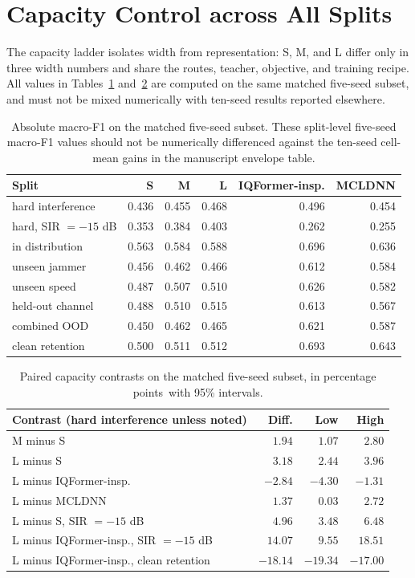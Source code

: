 \documentclass[letterpaper,onecolumn,11pt,journal]{IEEEtran}
\newcommand{\pp}{percentage points}
\begin{document}
\section{Capacity Control across All Splits}
The capacity ladder isolates width from representation: S, M, and L differ only
in three width numbers and share the routes, teacher, objective, and training
recipe. All values in Tables~\ref{tab:capabs} and~\ref{tab:capdiff} are
computed on the same matched five-seed subset, and must not be mixed
numerically with ten-seed results reported elsewhere.

\begin{table}[t]
\centering
\caption{Absolute macro-F1 on the matched five-seed subset. These split-level
five-seed macro-F1 values should not be numerically differenced against the
ten-seed cell-mean gains in the manuscript envelope table.}
\label{tab:capabs}
\footnotesize
\setlength{\tabcolsep}{4pt}
\begin{tabular}{lrrrrr}
\toprule
Split & S & M & L & IQFormer-insp. & MCLDNN\\
\midrule
hard interference & 0.436 & 0.455 & 0.468 & 0.496 & 0.454\\
hard, SIR $=-15$ dB & 0.353 & 0.384 & 0.403 & 0.262 & 0.255\\
in distribution & 0.563 & 0.584 & 0.588 & 0.696 & 0.636\\
unseen jammer & 0.456 & 0.462 & 0.466 & 0.612 & 0.584\\
unseen speed & 0.487 & 0.507 & 0.510 & 0.626 & 0.582\\
held-out channel & 0.488 & 0.510 & 0.515 & 0.613 & 0.567\\
combined OOD & 0.450 & 0.462 & 0.465 & 0.621 & 0.587\\
clean retention & 0.500 & 0.511 & 0.512 & 0.693 & 0.643\\
\bottomrule
\end{tabular}
\end{table}

\begin{table}[t]
\centering
\caption{Paired capacity contrasts on the matched five-seed subset, in \pp\
with 95\% intervals.}
\label{tab:capdiff}
\footnotesize
\setlength{\tabcolsep}{4pt}
\begin{tabular}{lrrr}
\toprule
Contrast (hard interference unless noted) & Diff. & Low & High\\
\midrule
M minus S & $1.94$ & $1.07$ & $2.80$\\
L minus S & $3.18$ & $2.44$ & $3.96$\\
L minus IQFormer-insp. & $-2.84$ & $-4.30$ & $-1.31$\\
L minus MCLDNN & $1.37$ & $0.03$ & $2.72$\\
L minus S, SIR $=-15$ dB & $4.96$ & $3.48$ & $6.48$\\
L minus IQFormer-insp., SIR $=-15$ dB & $14.07$ & $9.55$ & $18.51$\\
L minus IQFormer-insp., clean retention & $-18.14$ & $-19.34$ & $-17.00$\\
\bottomrule
\end{tabular}
\end{table}
\end{document}
